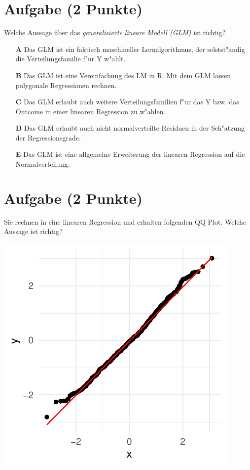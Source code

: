 \documentclass[a4paper, 10pt]{scrartcl}\usepackage[]{graphicx}\usepackage[]{xcolor}
\makeatletter
\def\maxwidth{ %
  \ifdim\Gin@nat@width>\linewidth
    \linewidth
  \else
    \Gin@nat@width
  \fi
}
\makeatother
\begin{document}
\section{Aufgabe \hfill (2 Punkte)}

Welche Aussage {\"u}ber das \textit{generalisierte lineare Modell (GLM)} ist richtig?  



\begin{enumerate}
\item [\textbf{A} \msquare] Das GLM ist ein faktisch maschineller Lernalgorithmus, der selstst{"a}ndig die Verteilungsfamilie f{"u}r Y w{"a}hlt.
\item [\textbf{B} \msquare] Das GLM ist eine Vereinfachung des LM in R. Mit dem GLM lassen polygonale Regressionen rechnen.
\item [\textbf{C} \msquare] Das GLM erlaubt auch weitere Verteilungsfamilien f{"u}r das Y bzw. das Outcome in einer linearen Regression zu w{"a}hlen.
\item [\textbf{D} \msquare] Das GLM erlaubt auch nicht normalverteilte Residuen in der Sch{"a}tzung der Regressionsgrade.
\item [\textbf{E} \msquare] Das GLM ist eine allgemeine Erweiterung der linearen Regression auf die Normalverteilung.
\end{enumerate}

\section{Aufgabe \hfill (2 Punkte)}

Sie rechnen in eine linearen Regression und erhalten folgenden QQ
Plot. Welche Aussage ist richtig?




{\centering \includegraphics[width=\maxwidth]{img/mc-regression-05-a-1} 

}
\end{document}
